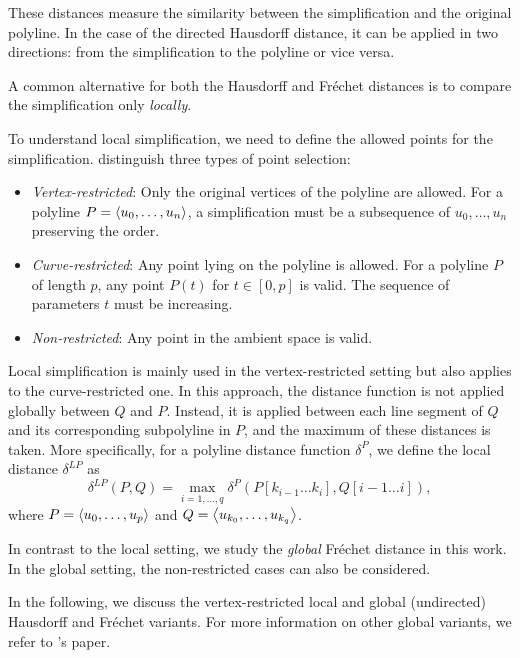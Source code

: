 These distances measure the similarity between the simplification and the original polyline. In the case of the directed Hausdorff distance, it can be applied in two directions: from the simplification to the polyline or vice versa.

A common alternative for both the Hausdorff and Fréchet distances is to compare the simplification only \emph{locally}.

To understand local simplification, we need to define the allowed points for the simplification. \citeauthor{global_curve_simplification} distinguish three types of point selection:
\begin{itemize}
  \item \emph{Vertex-restricted}: Only the original vertices of the polyline are allowed. For a polyline \(P = \left\langle u_0, \dots, u_n\right\rangle\), a simplification must be a subsequence of \(u_0, \dots, u_n\) preserving the order.
	\item \emph{Curve-restricted}: Any point lying on the polyline is allowed. For a polyline \(P\) of length \(p\), any point \(P(t)\) for \(t \in [0, p]\) is valid. The sequence of parameters \(t\) must be increasing.
	\item \emph{Non-restricted}: Any point in the ambient space is valid.
\end{itemize}

Local simplification is mainly used in the vertex-restricted setting but also applies to the curve-restricted one. In this approach, the distance function is not applied globally between \(Q\) and \(P\). Instead, it is applied between each line segment of \(Q\) and its corresponding subpolyline in \(P\), and the maximum of these distances is taken. More specifically, for a polyline distance function \(\delta^P\), we define the local distance \(\delta^{LP}\) as
\[\delta^{LP}(P, Q) = \max_{i = 1, \dots, q} \delta^P(P[k_{i-1}\dots k_i], Q[i-1 \dots i]),\]
where \(P = \left\langle u_0, \dots, u_p\right\rangle\) and \(Q = \left\langle u_{k_0}, \dots, u_{k_q}\right\rangle\).

In contrast to the local setting, we study the \emph{global} Fréchet distance in this work. In the global setting, the non-restricted cases can also be considered.

In the following, we discuss the vertex-restricted local and global (undirected) Hausdorff and Fréchet variants. For more information on other global variants, we refer to \citeauthor{global_curve_simplification}'s paper.

